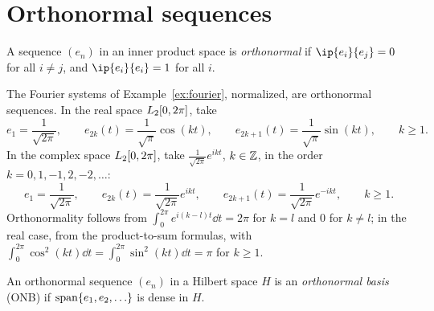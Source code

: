 \section{Orthonormal sequences}

\begin{definition}\label{def:orthonormal}
A sequence $(e_n)$ in an inner product space is \emph{orthonormal} if
$\ip{e_i}{e_j} = 0$ for all $i \ne j$, and $\ip{e_i}{e_i} = 1$ for all $i$.
\end{definition}

\begin{example}\label{ex:trig-orthonormal}
The Fourier systems of Example~\ref{ex:fourier}, normalized, are orthonormal
sequences. In the real space $L_{2}[0,2\pi]$, take
\[
  e_1 = \frac{1}{\sqrt{2\pi}} , \qquad
  e_{2k}(t) = \frac{1}{\sqrt{\pi}} \cos(kt) , \qquad
  e_{2k+1}(t) = \frac{1}{\sqrt{\pi}} \sin(kt) , \qquad k \ge 1 .
\]
In the complex space $L_{2}[0,2\pi]$, take $\frac{1}{\sqrt{2\pi}} e^{ikt}$,
$k \in \mathbb{Z}$, in the order $k = 0, 1, -1, 2, -2, \dots$:
\[
  e_1 = \frac{1}{\sqrt{2\pi}} , \qquad
  e_{2k}(t) = \frac{1}{\sqrt{2\pi}} e^{ikt} , \qquad
  e_{2k+1}(t) = \frac{1}{\sqrt{2\pi}} e^{-ikt} , \qquad k \ge 1 .
\]
Orthonormality follows from $\int_0^{2\pi} e^{i(k-l)t} \dd t = 2\pi$ for
$k = l$ and $0$ for $k \ne l$; in the real case, from the product-to-sum
formulas, with $\int_0^{2\pi} \cos^2(kt) \dd t
= \int_0^{2\pi} \sin^2(kt) \dd t = \pi$ for $k \ge 1$.
\end{example}

\begin{definition}\label{def:onb}
An orthonormal sequence $(e_n)$ in a Hilbert space $H$ is an
\emph{orthonormal basis} (ONB) if $\operatorname{span}\set{e_1, e_2, \dots}$
is dense in $H$.
\end{definition}
